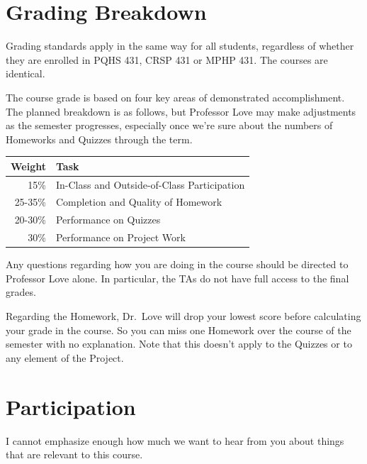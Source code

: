 \documentclass[
]{book}
\begin{document}
\hypertarget{grading-breakdown}{%
\section{Grading Breakdown}\label{grading-breakdown}}

Grading standards apply in the same way for all students, regardless of whether they are enrolled in PQHS 431, CRSP 431 or MPHP 431. The courses are identical.

The course grade is based on four key areas of demonstrated accomplishment. The planned breakdown is as follows, but Professor Love may make adjustments as the semester progresses, especially once we're sure about the numbers of Homeworks and Quizzes through the term.

\begin{longtable}[]{@{}rl@{}}
\toprule
Weight & Task\tabularnewline
\midrule
\endhead
15\% & In-Class and Outside-of-Class Participation\tabularnewline
25-35\% & Completion and Quality of Homework\tabularnewline
20-30\% & Performance on Quizzes\tabularnewline
30\% & Performance on Project Work\tabularnewline
\bottomrule
\end{longtable}

Any questions regarding how you are doing in the course should be directed to Professor Love alone. In particular, the TAs do not have full access to the final grades.

Regarding the Homework, Dr.~Love will drop your lowest score before calculating your grade in the course. So you can miss one Homework over the course of the semester with no explanation. Note that this doesn't apply to the Quizzes or to any element of the Project.

\hypertarget{participation}{%
\section{Participation}\label{participation}}

I cannot emphasize enough how much we want to hear from you about things that are relevant to this course.
\end{document}
